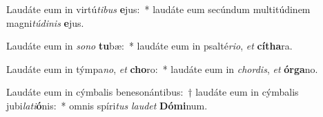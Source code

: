 \item Laudáte eum in virtú\textit{ti}\textit{bus} \textbf{e}jus:~* laudáte eum secúndum multitúdinem magni\textit{tú}\textit{di}\textit{nis} \textbf{e}jus.
\item Laudáte eum in \textit{so}\textit{no} \textbf{tu}bæ:~* laudáte eum in psalté\textit{ri}\textit{o}, \textit{et} \textbf{cí}\textbf{tha}ra.
\item Laudáte eum in týmpa\textit{no}, \textit{et} \textbf{cho}ro:~* laudáte eum in \textit{chor}\textit{dis}, \textit{et} \textbf{ór}\textbf{ga}no.
\item Laudáte eum in cýmbalis benesonántibus:~† laudáte eum in cýmbalis jubi\textit{la}\textit{ti}\textbf{ó}nis:~* omnis spíri\textit{tus} \textit{lau}\textit{det} \textbf{Dó}\textbf{mi}num.
